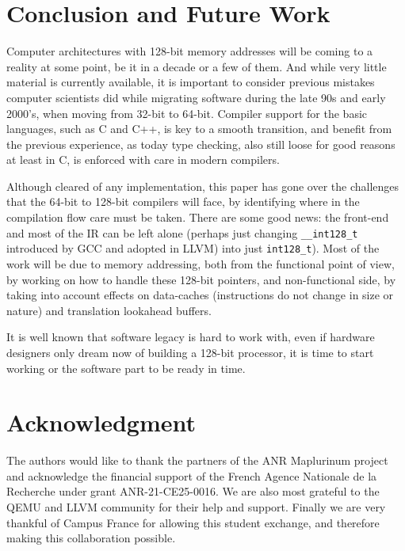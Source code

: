 \documentclass[a4paper,conference]{IEEEtran}
\begin{document}
\section{Conclusion and Future Work}
\label{sec:cc}
Computer architectures with 128-bit memory addresses will be coming to a reality at some point, be it in a decade or a few of them. And while very little material is currently available, it is important to consider previous mistakes computer scientists did while migrating software during the late 90s and early 2000's, when moving from 32-bit to 64-bit.
Compiler support for the basic languages, such as C and C++, is key to a smooth transition, and benefit from the previous experience, as today type checking, also still loose for good reasons at least in C, is enforced with care in modern compilers.

Although cleared of any implementation, this paper has gone over the challenges that the 64-bit to 128-bit compilers will face, by identifying where in the compilation flow care must be taken.
There are some good news: the front-end and most of the IR can be left alone (perhaps just changing \texttt{__int128_t} introduced by GCC and adopted in LLVM) into just \texttt{int128_t}).
Most of the work will be due to memory addressing, both from the functional point of view, by working on how to handle these 128-bit pointers, and non-functional side, by taking into account effects on data-caches (instructions do not change in size or nature) and translation lookahead buffers.

It is well known that software legacy is hard to work with, even if hardware designers only dream now of building a 128-bit processor, it is time to start working or the software part to be ready in time.

\section*{Acknowledgment}
The authors would like to thank the partners of the ANR Maplurinum project and acknowledge the financial support of the French Agence Nationale de la Recherche under grant ANR-21-CE25-0016.
We are also most grateful to the QEMU and LLVM community for their help and support.
Finally we are very thankful of Campus France for allowing this student exchange, and therefore making this collaboration possible.



\end{document}

